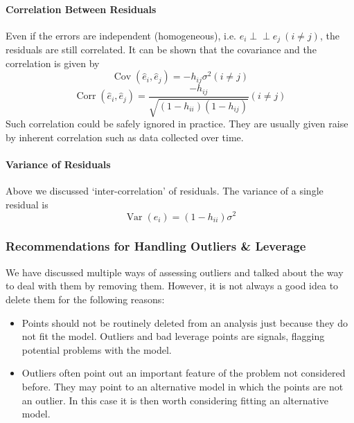 \documentclass[10pt]{article}
\newcommand{\independent}{\perp \!\!\! \perp}
\begin{document}
\paragraph{Correlation Between Residuals} Even if the errors are independent (homogeneous), i.e. $e_i \independent e_j~(i \neq j)$, the residuals are still correlated. It can be shown that the covariance and the correlation is given by
\begin{equation*}
    \operatorname{Cov}\left(\hat{e}_{i}, \hat{e}_{j}\right)=-h_{i j} \sigma^{2}(i \neq j)
\end{equation*}
\begin{equation*}
    \operatorname{Corr}\left(\hat{e}_{i}, \hat{e}_{j}\right)=\frac{-h_{i j}}{\sqrt{\left(1-h_{i i}\right)\left(1-h_{i j}\right)}}(i \neq j)
\end{equation*}
Such correlation could be safely ignored in practice. They are usually given raise by inherent correlation such as data collected over time.

\paragraph{Variance of Residuals} Above we discussed `inter-correlation' of residuals. \color{BurntOrange} The variance of a single residual is
\begin{equation*}
    \operatorname{Var}\left(\hat{e}_{i}\right)=\left(1-h_{i i}\right) \sigma^{2}
\end{equation*}
\color{Black}

\subsubsection{Recommendations for Handling Outliers \& Leverage}
We have discussed multiple ways of assessing outliers and talked about the way to deal with them by removing them. However, it is not always a good idea to delete them for the following reasons:
\begin{itemize}
    \item Points should not be routinely deleted from an analysis just because they do not fit the model. Outliers and bad leverage points are signals, flagging potential problems with the model.
    \item Outliers often point out an important feature of the problem not considered before. They may point to an alternative model in which the points are not an outlier. In this case it is then worth considering fitting an alternative model. 
\end{itemize}
\end{document}
